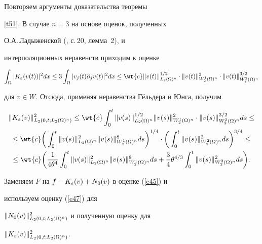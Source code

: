 \begin{pf}


Повторяем аргументы доказательства теоремы


\ref{t51}. В случае $n=3$ на основе оценок, полученных


О.А.\,Ладыженской (\cite{Lad}, с.\,20, лемма~2), и


интерполяционных неравенств приходим к оценке


$$


\intl{\Om}{}|K_{\eps}(v(t))|^2 dx \le 3 \intl{\Om}{}|v_j(t)


\partial_j v(t)|^2 dx


\le \wt{c} \|v(t)\|_{L_2(\Om)^n}^{1/2}\cdot \|v(t)\|_{W_2^1(\Om)^n}^2


\cdot \|v(t)\|_{W_2^2(\Om)^n}^{3/2}


$$


для $v \in W$. Отсюда, применяя неравенства Г\"ельдера и Юнга, получим


\begin{multline*}


\|K_{\eps}(v)\|_{L_2(0,t;L_2(\Om)^n)}^2\le \wt{c}


\intl 0 t \|v(s)\|_{L_2(\Om)^n}^{1/2}\|v(s)\|_{W_2^1(\Om)^n}^2


\cdot \|v(s)\|_{W_2^2(\Om)^n}^{3/2} ds \le \\


%


\le \wt{c} \bigg(\intl 0 t


\|v(s)\|_{L_2(\Om)^n}^2\|v(s)\|_{W_2^1(\Om)^n}^8 


ds\bigg)^{1/4}\cdot \bigg(\intl 0 t


\|v(s)\|_{W_2^2(\Om)^n}^2 ds \bigg)^{3/4} \le \\


%


\le \wt{c} \bigg({\frac{1}{4\theta^4}}\intl 0 t


\|v(s)\|_{L_2(\Om)^n}^2\|v(s)\|_{W_2^1(\Om)^n}^8 ds +


\frac{3}{4}\theta^{4/3} \intl 0 t \|v(s)\|_{W_2^2(\Om)^n}^2 ds \bigg). 


\end{multline*}


Заменяем $F$ на $f-K_{\varepsilon}(v)+N_0(v)$ в оценке (\ref{e45}) и


используем оценку (\ref{e47}) для 


$\|N_0(v)\|_{L_2(0,t;L_2(\Omega)^n)}^2$ и полученную оценку для


$\|K_{\varepsilon}(v)\|_{L_2(0,t;L_2(\Omega)^n)}^2$. 



\end{pf}
